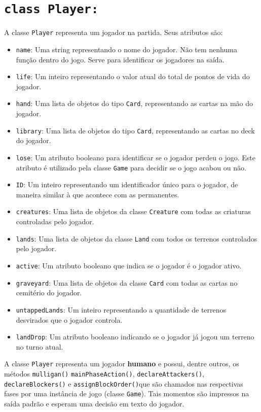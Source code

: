 \section{\texttt{class Player:}}
A classe \texttt{Player} representa um jogador na partida. Seus atributos são:
\begin{itemize}
  \item\texttt{name}: Uma string representando o nome do jogador. Não tem nenhuma função
  dentro do jogo. Serve para identificar os jogadores na saída.
  \item\texttt{life}: Um inteiro representando o valor atual do total de pontos de vida
  do jogador.
  \item\texttt{hand}: Uma lista de objetos do tipo \texttt{Card}, representando as cartas
  na mão do jogador.
  \item\texttt{library}: Uma lista de objetos do tipo \texttt{Card}, representando as cartas
  no deck do jogador.
  \item\texttt{lose}: Um atributo booleano para identificar se o jogador perdeu o jogo. Este
  atributo é utilizado pela classe \texttt{Game} para decidir se o jogo acabou ou não.
  \item\texttt{ID}: Um inteiro representando um identificador único para o jogador, de maneira
  similar à que acontece com as permanentes.
  \item\texttt{creatures}: Uma lista de objetos da classe \texttt{Creature} com todas as
  criaturas controladas pelo jogador.
  \item\texttt{lands}: Uma lista de objetos da classe \texttt{Land} com todos os terrenos
  controlados pelo jogador.
  \item\texttt{active}: Um atributo booleano que indica se o jogador é o jogador ativo.
  \item\texttt{graveyard}: Uma lista de objetos da classe \texttt{Card} com todas as cartas
  no cemitério do jogador.
  \item\texttt{untappedLands}: Um inteiro representando a quantidade de terrenos desvirados que
  o jogador controla.
  \item\texttt{landDrop}: Um atributo booleano indicando se o jogador já jogou um terreno no
  turno atual.
\end{itemize}

A classe \texttt{Player} representa um jogador \textbf{humano} e possui, dentre outros, os métodos \texttt{mulligan()} \texttt{mainPhaseAction()}, \texttt{declareAttackers()}, \texttt{declareBlockers()}  e \texttt{assignBlockOrder()}que são chamados nas respectivas fases por uma instância de jogo (classe \texttt{Game}). Tais momentos são impressos na saída padrão e esperam uma decisão em texto do jogador.

